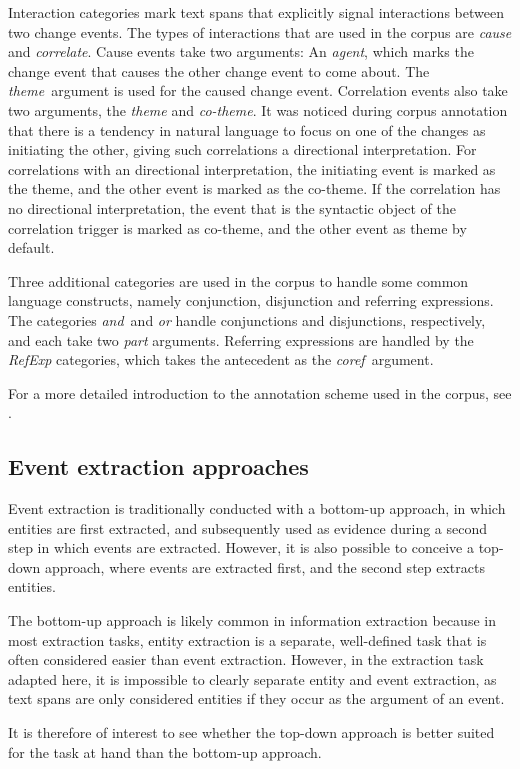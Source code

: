 Interaction categories mark text spans that explicitly signal interactions between two change events. The types of interactions that are used in the corpus are \emph{cause} and \emph{correlate}. Cause events take two arguments: An \emph{agent}, which marks the change event that causes the other change event to come about. The \emph{theme} argument is used for the caused change event. Correlation events also take two arguments, the \emph{theme} and \emph{co-theme}. It was noticed during corpus annotation that there is a tendency in natural language to focus on one of the changes as initiating the other, giving such correlations a directional interpretation. For correlations with an directional interpretation, the initiating event is marked as the theme, and the other event is marked as the co-theme. If the correlation has no directional interpretation, the event that is the syntactic object of the correlation trigger is marked as co-theme, and the other event as theme by default.

Three additional categories are used in the corpus to handle some common language constructs, namely conjunction, disjunction and referring expressions. The categories \emph{and} and \emph{or} handle conjunctions and disjunctions, respectively, and each take two \emph{part} arguments. Referring expressions are handled by the \emph{RefExp} categories, which takes the antecedent as the \emph{coref} argument.

For a more detailed introduction to the annotation scheme used in the corpus, see \citet{mar14}.

\subsection{Event extraction approaches}

Event extraction is traditionally conducted with a bottom-up approach, in which entities are first extracted, and subsequently used as evidence during a second step in which events are extracted. However, it is also possible to conceive a top-down approach, where events are extracted first, and the second step extracts entities. 

The bottom-up approach is likely common in information extraction because in most extraction tasks, entity extraction is a separate, well-defined task that is often considered easier than event extraction. However, in the extraction task adapted here, it is impossible to clearly separate entity and event extraction, as text spans are only considered entities if they occur as the argument of an event.

It is therefore of interest to see whether the top-down approach is better suited for the task at hand than the bottom-up approach.
